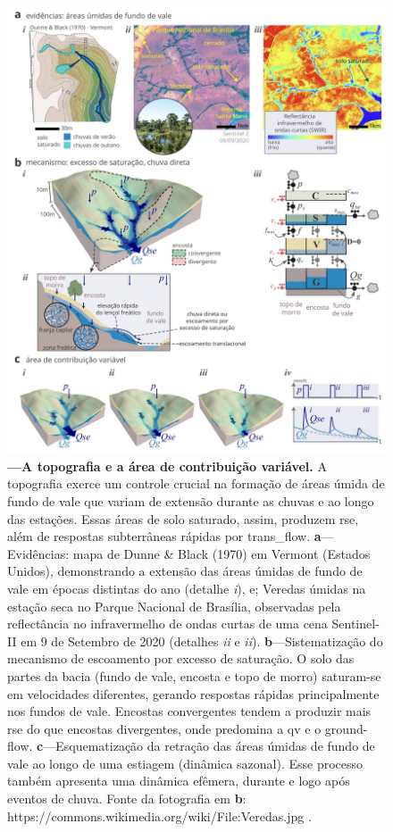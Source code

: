 \documentclass[./main.tex]{subfiles}
\begin{document}
\begin{figure}[t!] 
\centering				
\includegraphics[width=0.98\linewidth]{figs/fig_topo.jpg}		
\caption[A topografia e a área de contribuição variável]
{\textbf{---\;A topografia e a área de contribuição variável.}
    A topografia exerce um controle crucial na formação de áreas úmida de fundo de vale que variam de extensão durante as chuvas e ao longo das estações. Essas áreas de solo saturado, assim, produzem \gls{rse}, além de respostas subterrâneas rápidas por \gls{trans_flow}.
    \;\textbf{a}\;---\;Evidências: mapa de Dunne \& Black (1970) em Vermont (Estados Unidos), demonstrando a extensão das áreas úmidas de fundo de vale em épocas distintas do ano (detalhe \textrm{\textit{i}}), e; Veredas úmidas na estação seca no Parque Nacional de Brasília, observadas pela reflectância no infravermelho de ondas curtas de uma cena Sentinel-II em 9 de Setembro de 2020 (detalhes \textrm{\textit{ii}} e \textrm{\textit{ii}}). 
    \;\textbf{b}\;---\;Sistematização do mecanismo de escoamento por excesso de saturação. O solo das partes da bacia (fundo de vale, encosta e topo de morro) saturam-se em velocidades diferentes, gerando respostas rápidas principalmente nos fundos de vale. Encostas convergentes tendem a produzir mais \gls{rse} do que encostas divergentes, onde predomina a \gls{qv} e o \gls{ground-flow}.
    \;\textbf{c}\;---\;Esquematização da retração das áreas úmidas de fundo de vale ao longo de uma estiagem (dinâmica sazonal). Esse processo também apresenta uma dinâmica efêmera, durante e logo após eventos de chuva. Fonte da fotografia em \textbf{b}: https://commons.wikimedia.org/wiki/File:Veredas.jpg .
}
\label{fig:hydro:topo} 		
\end{figure}
\end{document}
